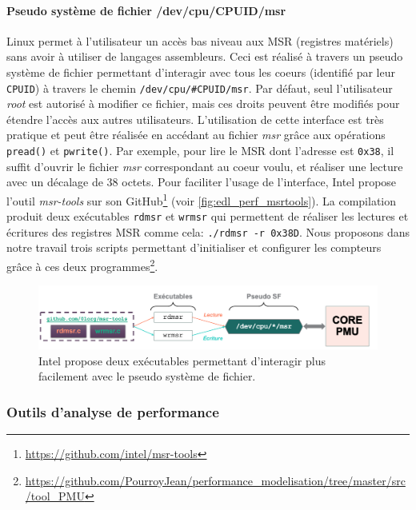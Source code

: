         \paragraph{Pseudo système de fichier /dev/cpu/CPUID/msr}
            
            Linux permet à l'utilisateur un accès bas niveau aux MSR (registres matériels) sans avoir à utiliser de langages assembleurs. Ceci est réalisé à travers un pseudo système de fichier permettant d'interagir avec tous les coeurs (identifié par leur \verb|CPUID|) à travers le chemin \verb|/dev/cpu/#CPUID/msr|. Par défaut, seul l'utilisateur \textit{root} est autorisé à modifier ce fichier, mais ces droits peuvent être modifiés pour étendre l'accès aux autres utilisateurs. L'utilisation de cette interface est très pratique et peut être réalisée en accédant au fichier \textit{msr} grâce aux opérations \verb|pread()| et \verb|pwrite()|. Par exemple, pour lire le MSR dont l'adresse est \verb|0x38|, il suffit d'ouvrir le fichier \textit{msr} correspondant au coeur voulu, et réaliser une lecture avec un décalage de 38 octets. Pour faciliter l'usage de l'interface, Intel propose l'outil \textit{msr-tools} sur son GitHub\footnote{\url{https://github.com/intel/msr-tools}} (voir \autoref{fig:edl_perf_msrtools}).  La compilation produit deux exécutables \verb|rdmsr| et \verb|wrmsr| qui permettent de réaliser les lectures et écritures des registres MSR comme cela: \verb|./rdmsr -r 0x38D|. Nous proposons dans notre travail trois scripts permettant d'initialiser et configurer les compteurs grâce à ces deux programmes\footnote{\url{https://github.com/PourroyJean/performance_modelisation/tree/master/src/tool_PMU}}. 

            
            \begin{figure}[h!]
            \center
            \includegraphics[width=16cm]{images/edl_perf_msrtools.png}
            \caption{\label{fig:edl_perf_msrtools} Intel propose deux exécutables permettant d'interagir plus facilement avec le pseudo système de fichier.}
            \end{figure}


    \subsubsection{Outils d'analyse de performance}
    
